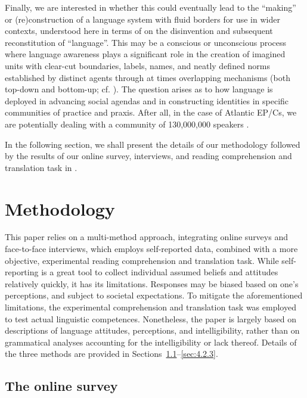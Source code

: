 \documentclass[output=paper,colorlinks,citecolor=brown]{langscibook}
\begin{document}
Finally, we are interested in whether this could eventually lead to the “making” or (re)construction of a language system with fluid borders for use in wider contexts, understood here in terms of \citet{Makoni_2005} on the disinvention and subsequent reconstitution of “language”. This may be a conscious or unconscious process where language awareness plays a significant role in the creation of imagined units with clear-cut boundaries, labels, names, and neatly defined norms established by distinct agents through at times overlapping mechanisms (both top-down and bottom-up; cf. \cite{Huning_Kramer_2018}). The question arises as to how language is deployed in advancing social agendas and in constructing identities in specific communities of practice and praxis. After all, in the case of Atlantic EP/Cs, we are potentially dealing with a community of 130,000,000 speakers \citep{Faraclas_2020}. 

In the following section, we shall present the details of our methodology followed by the results of our online survey, interviews, and reading comprehension and translation task in .

\section{Methodology}\label{sec:04:2}

This paper relies on a multi-method approach, integrating online surveys and face-to-face interviews, which employs self-reported data, combined with a more objective, experimental reading comprehension and translation task. While self-reporting is a great tool to collect individual assumed beliefs and attitudes relatively quickly, it has its limitations. Responses may be biased based on one’s perceptions, and subject to societal expectations. To mitigate the aforementioned limitations, the experimental comprehension and translation task was employed to test actual linguistic competences. Nonetheless, the paper is largely based on descriptions of language attitudes, perceptions, and intelligibility, rather than on grammatical analyses accounting for the intelligibility or lack thereof. Details of the three methods are provided in Sections~\ref{sec:4:2.1}--\ref{sec:4.2.3}.

\subsection{The online survey}\label{sec:4:2.1}
\end{document}
